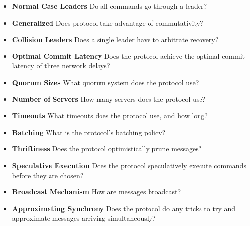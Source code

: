 \begin{itemize}
  \setlength\itemsep{0pt}

  \item \textbf{Normal Case Leaders}
    Do all commands go through a leader?

  \item \textbf{Generalized}
    Does protocol take advantage of commutativity?

  \item \textbf{Collision Leaders}
    Does a single leader have to arbitrate recovery?

  \item \textbf{Optimal Commit Latency}
    Does the protocol achieve the optimal commit latency of three network
    delays?

  \item \textbf{Quorum Sizes}
    What quorum system does the protocol use?

  \item \textbf{Number of Servers}
    How many servers does the protocol use?

  \item \textbf{Timeouts}
    What timeouts does the protocol use, and how long?

  \item \textbf{Batching}
    What is the protocol's batching policy?

  \item \textbf{Thriftiness}
    Does the protocol optimistically prune messages?

  \item \textbf{Speculative Execution}
    Does the protocol speculatively execute commands before they are chosen?

  \item \textbf{Broadcast Mechanism}
    How are messages broadcast?

  \item \textbf{Approximating Synchrony}
    Does the protocol do any tricks to try and approximate messages arriving
    simultaneously?
\end{itemize}
